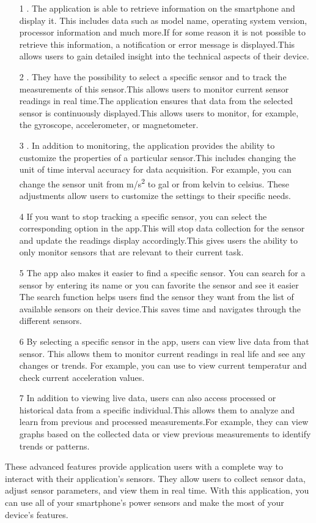 \documentclass[12pt]{article}
\newcounter{fr}
\begin{document}
\begin{itemize}
    \item[1]. The application is able to retrieve information on the smartphone and display it. This includes data such as model name, operating system version, processor information and much more.If for some reason it is not possible to retrieve this information, a notification or error message is displayed.This allows users to gain detailed insight into the technical aspects of their device.  
    \item[2]. They have the possibility to select a specific sensor and to track the measurements of this sensor.This allows users to monitor current sensor readings in real time.The application ensures that data from the selected sensor is continuously displayed.This allows users to monitor, for example, the gyroscope, accelerometer, or magnetometer.  
    \item[3]. In addition to monitoring, the application provides the ability to customize the properties of a particular sensor.This includes changing the unit of time interval accuracy for data acquisition. For example, you can change the sensor unit from  m/s\textsuperscript{2} to gal or from kelvin to celsius. These adjustments allow users to customize the settings to their specific needs. 
    \item[4]
    If you want to stop tracking a specific sensor, you can select the corresponding option in the app.This will stop data collection for the sensor and update the readings display accordingly.This gives users the ability to only monitor sensors that are relevant to their current task.
    \item[5]
    The app also makes it easier to find a specific sensor. You can search for a sensor by entering its name or you can favorite the sensor and see it easier
    The search function helps users find the sensor they want from the list of available sensors on their device.This saves time and navigates through the different sensors.
    \item[6]
    By selecting a specific sensor in the app, users can view live data from that sensor. This allows them to monitor current readings in real life and see any changes or trends. For example, you can use to view current temperatur and check current acceleration values. 
    \item[7]
    In addition to viewing live data, users can also access processed or historical data from a specific individual.This allows them to analyze and learn from previous and processed measurements.For example, they can view graphs based on the collected data or view previous measurements to identify trends or patterns.
\end{itemize}
    These advanced features provide application users with a complete way to interact with their application's sensors. They allow users to collect sensor data, adjust sensor parameters, and view them in real time. With this application, you can use all of your smartphone's power sensors and make the most of your device's features.
\end{document}
